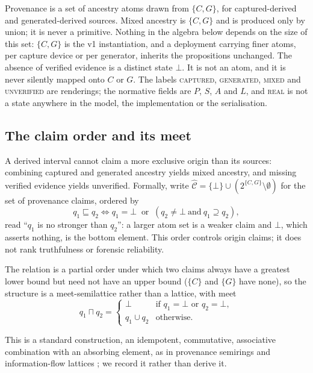 \documentclass[preprint,3p,11pt,authoryear]{elsarticle}
\newcommand{\C}{\ensuremath{C}}
\newcommand{\G}{\ensuremath{G}}
\begin{document}
Provenance is a set of ancestry atoms drawn from $\{\C, \G\}$, for
captured-derived and generated-derived sources. Mixed ancestry is $\{\C,\G\}$
and is produced only by union; it is never a primitive. Nothing in the algebra
below depends on the size of this set: $\{\C,\G\}$ is the v1 instantiation,
and a deployment carrying finer atoms, per capture device or per generator,
inherits the propositions unchanged. The absence of verified evidence is a
distinct state $\bot$. It is not an atom, and it is never silently
mapped onto $\C$ or $\G$. The labels \textsc{captured}, \textsc{generated}, \textsc{mixed} and
\textsc{unverified} are renderings; the normative fields are $P$, $S$, $A$
and $L$, and \textsc{real} is not a state anywhere in the model, the
implementation or the serialisation.

\subsection{The claim order and its meet}

A derived interval cannot claim a more exclusive origin than its sources:
combining captured and generated ancestry yields mixed ancestry, and missing
verified evidence yields unverified. Formally, write
$\widehat{\mathcal{C}} = \{\bot\} \cup (2^{\{\C,\G\}} \setminus \emptyset)$ for
the set of provenance claims, ordered by
\begin{equation}
q_1 \sqsubseteq q_2 \iff q_1 = \bot \ \text{ or }\ (q_2 \neq \bot \ \text{and}\
q_1 \supseteq q_2),
\label{eq:order}
\end{equation}
read ``$q_1$ is no stronger than $q_2$'': a larger atom set is a weaker
claim and $\bot$, which asserts nothing, is the bottom element. This order
controls origin claims; it does not rank truthfulness or forensic reliability.

The relation is a partial order under which two claims always have a greatest lower bound but
need not have an upper bound ($\{\C\}$ and $\{\G\}$ have none), so the
structure is a meet-semilattice rather than a lattice, with meet
\begin{equation}
q_1 \sqcap q_2 =
\begin{cases}
\bot & \text{if } q_1 = \bot \text{ or } q_2 = \bot,\\
q_1 \cup q_2 & \text{otherwise.}
\end{cases}
\label{eq:meet}
\end{equation}

This is a standard construction, an idempotent, commutative, associative
combination with an absorbing element, as in provenance semirings
\citep{green2007provenance} and information-flow lattices
\citep{denning1976lattice}; we record it rather than derive it.
\end{document}
